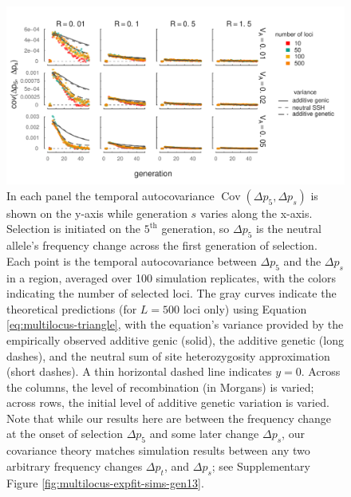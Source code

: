 \documentclass[11pt]{article}
\DeclareMathOperator{\cov}{Cov}
\begin{document}
\begin{figure}[!ht]
  \centering
  \includegraphics{./images/sim-pred-covs-varyl-alt.pdf}

  \caption{ In each panel the temporal autocovariance $\cov(\Delta p_5, \Delta
    p_s)$ is shown on the y-axis while generation $s$ varies along the x-axis.
    Selection is initiated on the $5^\text{th}$ generation, so $\Delta p_5$ is
    the neutral allele's frequency change across the first generation of
    selection. Each point is the temporal autocovariance between $\Delta p_5$
    and the $\Delta p_s$ in a region, averaged over 100 simulation replicates,
    with the colors indicating the number of selected loci. The gray curves
    indicate the theoretical predictions (for $L=500$ loci only) using Equation
    \eqref{eq:multilocus-triangle}, with the equation's variance provided by
    the empirically observed additive genic (solid), the additive genetic (long
    dashes), and the neutral sum of site heterozygosity approximation (short
    dashes). A thin horizontal dashed line indicates $y=0$.  Across the
    columns, the level of recombination (in Morgans) is varied; across rows,
    the initial level of additive genetic variation is varied.  Note that while
    our results here are between the frequency change at the onset of selection
    $\Delta p_5$ and some later change $\Delta p_s$, our covariance theory
    matches simulation results between any two arbitrary frequency changes
  $\Delta p_t$, and $\Delta p_s$; see Supplementary Figure
\ref{fig:multilocus-expfit-sims-gen13}.}

  \label{fig:multilocus-expfit-sims}
\end{figure}
\end{document}
